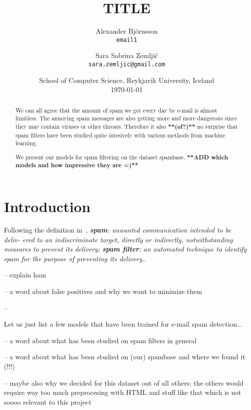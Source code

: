 \documentclass[12pt,a4paper]{article}
\begin{document}
\title{TITLE}

\author{
	Alexander Bj\"ornsson\\
	{\tt email1}
\and
	Sara Sabrina Zemlji\v c \\
	{\tt sara.zemljic@gmail.com}
}

\date{{\small School of Computer Science, Reykjavik University, Iceland}\\
\medskip
{\small \today}}
\maketitle

\begin{abstract}
We can all agree that the amount of spam we get every day by e-mail is almost limitless. The annoying spam messages are also getting more and more dangerous since they may contain viruses or other threats. Therefore it also \textbf{**(of?)**} no surprise that spam filters have been studied quite intesively with various methods from machine learning.

We present our models for spam filtering on the dataset spambase. \textbf{**ADD which models and how impressive they are =)**}
\end{abstract}

\section{Introduction}

Following the definition in~\cite[p.2]{Cormack-2006}, \textit{\textbf{spam}: unwanted communication intended to be deliv- ered to an indiscriminate target, directly or indirectly, notwithstanding measures to prevent its delivery; \textbf{spam filter}: an automated technique to identify spam for the purpose of preventing its delivery.}.

-- explain ham

-- a word about false positives and why we want to minimize them

--


Let us just list a few models that have been trained for e-mail spam detection...

-- a word about what has been studied on spam filters in general

-- a word about what has been studied on (our) spambase and where we found it (!!!)

-- maybe also why we decided for this dataset out of all others: the others would require way too much preprocesing with HTML and stuff like that which is not soooo relevant to this project
\end{document}
